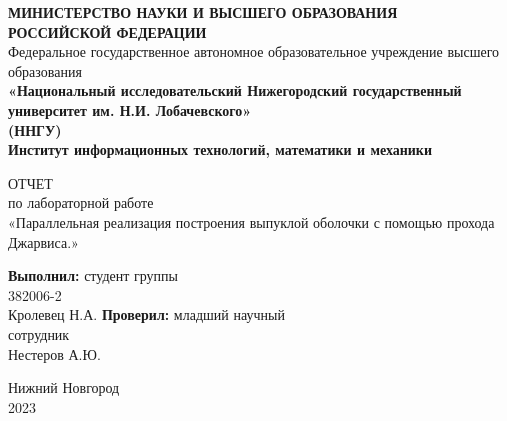 \documentclass[14pt, a4paper]{extarticle}
\title{}
\author{}
\date{}
\begin{document}
  \begin{titlepage}
    \begin{center}
      {\bfseries МИНИСТЕРСТВО НАУКИ И ВЫСШЕГО ОБРАЗОВАНИЯ \\
        РОССИЙСКОЙ ФЕДЕРАЦИИ}
      \\
      Федеральное государственное автономное образовательное учреждение высшего образования
      \\
      {\bfseries «Национальный исследовательский Нижегородский государственный университет им. Н.И. Лобачевского»\\(ННГУ)
        \\Институт информационных технологий, математики и механики} \\
    \end{center}

    \vspace{8em}

    \begin{center}
      ОТЧЕТ \\ по лабораторной работе \\
      «Параллельная реализация построения выпуклой оболочки с помощью прохода Джарвиса.»
    \end{center}

    \vspace{5em}


    \begin{flushright}
      {\bfseries Выполнил:} студент группы\\382006-2\\Кролевец Н.А. \underline{\hspace{3cm}} \linebreak\linebreak\linebreak
      {\bfseries Проверил:} младший научный\\сотрудник\\Нестеров А.Ю. \underline{\hspace{3cm}} 
    \end{flushright}


    \vspace{\fill}

    \begin{center}
      Нижний Новгород\\2023
    \end{center}

  \end{titlepage}

  \tableofcontents
  \thispagestyle{empty}
  \newpage
\end{document}
